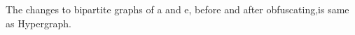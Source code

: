 \documentclass[runningheads,a4paper]{llncs}
\begin{document}
The changes to bipartite graphs of a and e, before and after obfuscating,is same as Hypergraph. 


\end{document}
